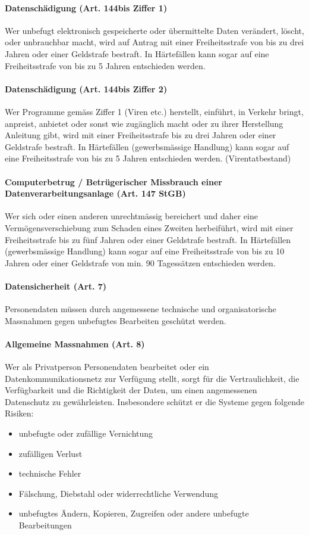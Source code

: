 \paragraph{Datenschädigung (Art. 144bis Ziffer 1)}
Wer unbefugt elektronisch gespeicherte oder übermittelte Daten verändert, löscht, oder unbrauchbar macht, wird auf Antrag mit einer Freiheitsstrafe von bis zu drei Jahren oder einer Geldstrafe bestraft. In Härtefällen kann sogar auf eine Freiheitsstrafe von bis zu 5 Jahren entschieden werden.

\paragraph{Datenschädigung (Art. 144bis Ziffer 2)}
Wer Programme gemäss Ziffer 1 (Viren etc.) herstellt, einführt, in Verkehr bringt, anpreist, anbietet oder sonst wie zugänglich macht oder zu ihrer Herstellung Anleitung gibt, wird mit einer Freiheitsstrafe bis zu drei Jahren oder einer Geldstrafe bestraft. In Härtefällen (gewerbsmässige Handlung) kann sogar auf eine Freiheitsstrafe von bis zu 5 Jahren entschieden werden. (Virentatbestand)

\paragraph{Computerbetrug / Betrügerischer Missbrauch einer Datenverarbeitungsanlage (Art. 147 StGB)}
Wer sich oder einen anderen unrechtmässig bereichert und daher eine Vermögensverschiebung zum Schaden eines Zweiten herbeiführt, wird mit einer Freiheitsstrafe bis zu fünf Jahren oder einer Geldstrafe bestraft. In Härtefällen (gewerbsmässige Handlung) kann sogar auf eine Freiheitsstrafe von bis zu 10 Jahren oder einer Geldstrafe von min. 90 Tagessätzen entschieden werden.

\paragraph{Datensicherheit (Art. 7)}
Personendaten müssen durch angemessene technische und organisatorische Massnahmen gegen unbefugtes Bearbeiten geschützt werden.

\paragraph{Allgemeine Massnahmen (Art. 8)}
Wer als Privatperson Personendaten bearbeitet oder ein Datenkommunikationsnetz zur Verfügung stellt, sorgt für die Vertraulichkeit, die Verfügbarkeit und die Richtigkeit der Daten, um einen angemessenen Datenschutz zu gewährleisten. Insbesondere schützt er die Systeme gegen folgende Risiken:
\begin{itemize}
	\item unbefugte oder zufällige Vernichtung
	\item zufälligen Verlust
	\item technische Fehler
	\item Fälschung, Diebstahl oder widerrechtliche Verwendung
	\item unbefugtes Ändern, Kopieren, Zugreifen oder andere unbefugte Bearbeitungen
\end{itemize}



